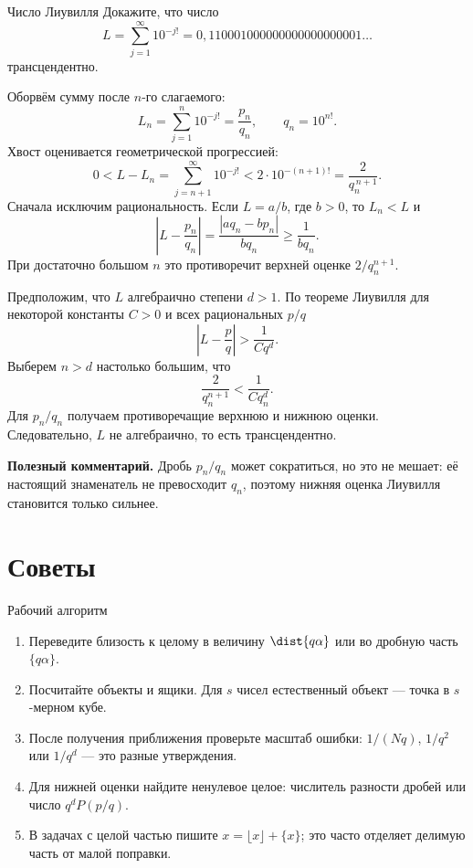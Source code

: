 \begin{problembox}{Число Лиувилля}
Докажите, что число
\[
  L=\sum_{j=1}^{\infty}10^{-j!}
   =0{,}110001000000000000000001\ldots
\]
трансцендентно.
\end{problembox}

\begin{solutionbox}
Оборвём сумму после $n$-го слагаемого:
\[
  L_n=\sum_{j=1}^{n}10^{-j!}=\frac{p_n}{q_n},
  \qquad q_n=10^{n!}.
\]
Хвост оценивается геометрической прогрессией:
\[
  0<L-L_n
  =\sum_{j=n+1}^{\infty}10^{-j!}
  <2\cdot10^{-(n+1)!}
  =\frac{2}{q_n^{\,n+1}}.
\]
Сначала исключим рациональность. Если $L=a/b$, где $b>0$, то
$L_n<L$ и
\[
  \left|L-\frac{p_n}{q_n}\right|
  =\frac{|aq_n-bp_n|}{bq_n}\ge\frac1{bq_n}.
\]
При достаточно большом $n$ это противоречит верхней оценке
$2/q_n^{n+1}$.

Предположим, что $L$ алгебраично степени $d>1$. По теореме Лиувилля
для некоторой константы $C>0$ и всех рациональных $p/q$
\[
  \left|L-\frac pq\right|>\frac1{Cq^d}.
\]
Выберем $n>d$ настолько большим, что
\[
  \frac{2}{q_n^{n+1}}<\frac1{Cq_n^d}.
\]
Для $p_n/q_n$ получаем противоречащие верхнюю и нижнюю оценки.
Следовательно, $L$ не алгебраично, то есть трансцендентно.

\textbf{Полезный комментарий.}
Дробь $p_n/q_n$ может сократиться, но это не мешает: её настоящий
знаменатель не превосходит $q_n$, поэтому нижняя оценка Лиувилля
становится только сильнее.
\end{solutionbox}

\section{Советы}

\begin{methodbox}{Рабочий алгоритм}
\begin{enumerate}
  \item Переведите близость к целому в величину $\dist{q\alpha}$ или
        во дробную часть $\{q\alpha\}$.
  \item Посчитайте объекты и ящики. Для $s$ чисел естественный объект
        --- точка в $s$-мерном кубе.
  \item После получения приближения проверьте масштаб ошибки:
        $1/(Nq)$, $1/q^2$ или $1/q^d$ --- это разные утверждения.
  \item Для нижней оценки найдите ненулевое целое: числитель разности
        дробей или число $q^dP(p/q)$.
  \item В задачах с целой частью пишите $x=\lfloor x\rfloor+\{x\}$;
        это часто отделяет делимую часть от малой поправки.
\end{enumerate}
\end{methodbox}

